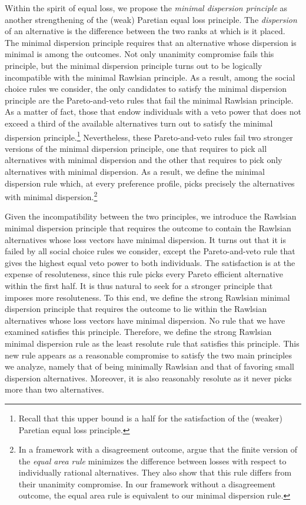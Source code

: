 \documentclass[pagesize, twoside=off, bibliography=totoc, DIV=calc, fontsize=12pt, a4paper]{scrartcl}
\begin{document}
Within the spirit of equal loss, we propose the \textit{minimal dispersion principle} as another strengthening of the (weak) Paretian equal loss principle. The \textit{dispersion} of an alternative is the difference between the two ranks at which is it placed. The minimal dispersion principle requires that an alternative whose dispersion is minimal is among the outcomes. Not only unanimity compromise fails this principle, but the minimal dispersion principle turns out to be logically incompatible with the minimal Rawlsian principle. As a result, among the social choice rules we consider, the only candidates to satisfy the minimal dispersion principle are the Pareto-and-veto rules that fail the minimal Rawlsian principle. As a matter of fact, those that endow individuals with a veto power that does not exceed a third of the available alternatives turn out to satisfy the minimal dispersion principle.\footnote{Recall that this upper bound is a half for the satisfaction of the (weaker) Paretian equal loss principle.} Nevertheless, these Pareto-and-veto rules fail two stronger versions of the minimal dispersion principle, one that requires to pick all alternatives with minimal dispersion and the other that requires to pick only alternatives with minimal dispersion. As a result, we define the minimal dispersion rule which, at every preference profile, picks precisely the alternatives with minimal dispersion.\footnote{
In a framework \label{ft:equalarea} with a disagreement outcome, \citet{KibrisSertel2007} argue that the finite version of the \textit{equal area rule} \citep{thomson1994cooperative} minimizes the difference between losses with respect to individually rational alternatives. They also show that this rule differs from their unanimity compromise. In our framework without a disagreement outcome, the equal area rule is equivalent to our minimal dispersion rule.}

Given the incompatibility between the two principles, we introduce the Rawlsian minimal dispersion principle that requires the outcome to contain the Rawlsian alternatives whose loss vectors have minimal dispersion. It turns out that it is failed by all social choice rules we consider, except the Pareto-and-veto rule that gives the highest equal veto power to both individuals. The satisfaction is at the expense of resoluteness, since this rule picks every Pareto efficient alternative within the first half. It is thus natural to seek for a stronger principle that imposes more resoluteness. To this end, we define the strong Rawlsian minimal dispersion principle that requires the outcome to lie within the Rawlsian alternatives whose loss vectors have minimal dispersion. No rule that we have examined satisfies this principle. Therefore, we define the strong Rawlsian minimal dispersion rule as the least resolute rule that satisfies this principle. This new rule appears as a reasonable compromise to satisfy the two main principles we analyze, namely that of being minimally Rawlsian and that of favoring small dispersion alternatives. Moreover, it is also reasonably resolute as it never picks more than two alternatives.
\end{document}
